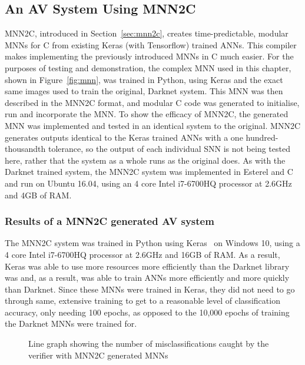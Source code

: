 \subsection{An \ac{AV} System Using \acf{MNN2C}}
\ac{MNN2C}, introduced in Section~\ref{sec:mnn2c}, creates time-predictable, modular \acfp{MNN} for C from existing Keras (with Tensorflow) trained \acp{ANN}. 
This compiler makes implementing the previously introduced \acfp{MNN} in C much easier.
For the purposes of testing and demonstration, the complex \ac{MNN} used in this chapter, shown in Figure~\ref{fig:mnn}, was trained in Python, using Keras and the exact same images used to train the original, Darknet system.
This \ac{MNN} was then described in the \ac{MNN2C} format, and modular C code was generated to initialise, run and incorporate the \ac{MNN}.
To show the efficacy of \ac{MNN2C}, the generated \ac{MNN} was implemented and tested in an identical system to the original. 
\ac{MNN2C} generates outputs identical to the Keras trained \acp{ANN} with a one hundred-thousandth tolerance, so the output of each individual \ac{SNN} is not being tested here, rather that the system as a whole runs as the original does.
As with the Darknet trained system, the \ac{MNN2C} system was implemented in Esterel and C and run on Ubuntu 16.04, using an 4 core Intel i7-6700HQ processor at 2.6GHz and 4GB of RAM.

\subsubsection{Results of a \ac{MNN2C} generated \ac{AV} system}
The \ac{MNN2C} system was trained in Python using Keras~\cite{chollet2015keras} on Windows 10, using a 4 core Intel i7-6700HQ processor at 2.6GHz and 16GB of RAM.
As a result, Keras was able to use more resources more efficiently than the Darknet library was and, as a result, was able to train \acp{ANN} more efficiently and more quickly than Darknet.
Since these \acp{MNN} were trained in Keras, they did not need to go through same, extensive training to get to a reasonable level of classification accuracy, only needing 100 epochs, as opposed to the 10,000 epochs of training the Darknet \acp{MNN} were trained for.

\begin{figure}[H]
	\centering
	\scalebox{0.9}{}
	\caption{Line graph showing the number of misclassifications caught by the verifier with \ac{MNN2C} generated \acp{MNN} \label{fig:sign-graphboth-mnn2c}}
\end{figure}

